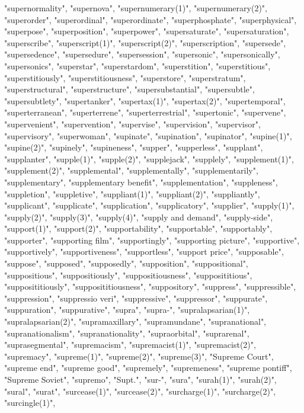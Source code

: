"supernormality",
"supernova",
"supernumerary(1)",
"supernumerary(2)",
"superorder",
"superordinal",
"superordinate",
"superphosphate",
"superphysical",
"superpose",
"superposition",
"superpower",
"supersaturate",
"supersaturation",
"superscribe",
"superscript(1)",
"superscript(2)",
"superscription",
"supersede",
"supersedence",
"supersedure",
"supersession",
"supersonic",
"supersonically",
"supersonics",
"superstar",
"superstardom",
"superstition",
"superstitious",
"superstitiously",
"superstitiousness",
"superstore",
"superstratum",
"superstructural",
"superstructure",
"supersubstantial",
"supersubtle",
"supersubtlety",
"supertanker",
"supertax(1)",
"supertax(2)",
"supertemporal",
"superterranean",
"superterrene",
"superterrestrial",
"supertonic",
"supervene",
"supervenient",
"supervention",
"supervise",
"supervision",
"supervisor",
"supervisory",
"superwoman",
"supinate",
"supination",
"supinator",
"supine(1)",
"supine(2)",
"supinely",
"supineness",
"supper",
"supperless",
"supplant",
"supplanter",
"supple(1)",
"supple(2)",
"supplejack",
"supplely",
"supplement(1)",
"supplement(2)",
"supplemental",
"supplementally",
"supplementarily",
"supplementary",
"supplementary benefit",
"supplementation",
"suppleness",
"suppletion",
"suppletive",
"suppliant(1)",
"suppliant(2)",
"suppliantly",
"supplicant",
"supplicate",
"supplication",
"supplicatory",
"supplier",
"supply(1)",
"supply(2)",
"supply(3)",
"supply(4)",
"supply and demand",
"supply-side",
"support(1)",
"support(2)",
"supportability",
"supportable",
"supportably",
"supporter",
"supporting film",
"supportingly",
"supporting picture",
"supportive",
"supportively",
"supportiveness",
"supportless",
"support price",
"supposable",
"suppose",
"supposed",
"supposedly",
"supposition",
"suppositional",
"suppositious",
"suppositiously",
"suppositiousness",
"supposititious",
"supposititiously",
"supposititiousness",
"suppository",
"suppress",
"suppressible",
"suppression",
"suppressio veri",
"suppressive",
"suppressor",
"suppurate",
"suppuration",
"suppurative",
"supra",
"supra-",
"supralapsarian(1)",
"supralapsarian(2)",
"supramaxillary",
"supramundane",
"supranational",
"supranationalism",
"supranationality",
"supraorbital",
"suprarenal",
"suprasegmental",
"supremacism",
"supremacist(1)",
"supremacist(2)",
"supremacy",
"supreme(1)",
"supreme(2)",
"supreme(3)",
"Supreme Court",
"supreme end",
"supreme good",
"supremely",
"supremeness",
"supreme pontiff",
"Supreme Soviet",
"supremo",
"Supt.",
"sur-",
"sura",
"surah(1)",
"surah(2)",
"sural",
"surat",
"surcease(1)",
"surcease(2)",
"surcharge(1)",
"surcharge(2)",
"surcingle(1)",
